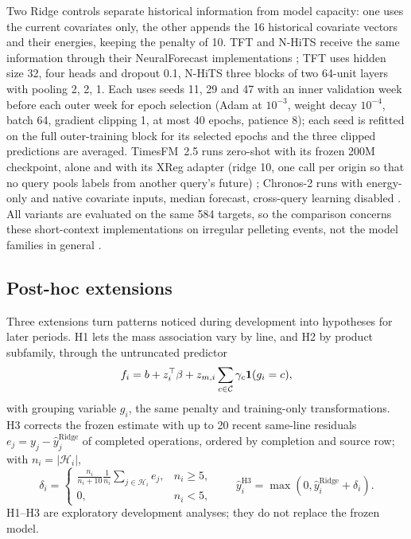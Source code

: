 Two Ridge controls separate historical information from model capacity: one uses the current covariates only, the other appends the 16 historical covariate vectors and their energies, keeping the penalty of 10. TFT and N-HiTS receive the same information through their NeuralForecast implementations \citep{nixtlatft,nixtlanhits}; TFT uses hidden size 32, four heads and dropout 0.1, N-HiTS three blocks of two 64-unit layers with pooling 2, 2, 1. Each uses seeds 11, 29 and 47 with an inner validation week before each outer week for epoch selection (Adam at $10^{-3}$, weight decay $10^{-4}$, batch 64, gradient clipping 1, at most 40 epochs, patience 8); each seed is refitted on the full outer-training block for its selected epochs and the three clipped predictions are averaged. TimesFM~2.5 runs zero-shot with its frozen 200M checkpoint, alone and with its XReg adapter (ridge 10, one call per origin so that no query pools labels from another query's future) \citep{das2024,timesfm25,timesfmrepo}; Chronos-2 runs with energy-only and native covariate inputs, median forecast, cross-query learning disabled \citep{ansari2025,chronosrepo}. All variants are evaluated on the same 584 targets, so the comparison concerns these short-context implementations on irregular pelleting events, not the model families in general \citep{aksu2024,zeng2023}.

\subsection{Post-hoc extensions}
Three extensions turn patterns noticed during development into hypotheses for later periods. H1 lets the mass association vary by line, and H2 by product subfamily, through the untruncated predictor
\begin{equation}
 f_i=b+z_i^\top\beta+z_{m,i}\sum_{c\in\mathcal C}\gamma_c\mathbf{1}(g_i=c),
 \label{eq:interaction}
\end{equation}
with grouping variable $g_i$, the same penalty and training-only transformations. H3 corrects the frozen estimate with up to 20 recent same-line residuals $e_j=y_j-\widehat y_j^{\mathrm{Ridge}}$ of completed operations, ordered by completion and source row; with $n_i=|\mathcal H_i|$,
\begin{equation}
 \delta_i=\begin{cases}
 \displaystyle\frac{n_i}{n_i+10}\frac{1}{n_i}\sum_{j\in\mathcal H_i}e_j,&n_i\ge5,\\
 0,&n_i<5,
 \end{cases}
 \qquad \widehat y_i^{\mathrm{H3}}=\max(0,\widehat y_i^{\mathrm{Ridge}}+\delta_i).
 \label{eq:bias}
\end{equation}
H1--H3 are exploratory development analyses; they do not replace the frozen model.

